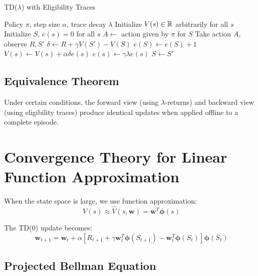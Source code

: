\begin{algorithm}
\caption{TD($\lambda$) with Eligibility Traces}
\begin{algorithmic}
\REQUIRE Policy $\pi$, step size $\alpha$, trace decay $\lambda$
\STATE Initialize $V(s) \in \mathbb{R}$ arbitrarily for all $s$
\REPEAT
    \STATE Initialize $S$, $e(s) = 0$ for all $s$
    \REPEAT
        \STATE $A \leftarrow$ action given by $\pi$ for $S$
        \STATE Take action $A$, observe $R, S'$
        \STATE $\delta \leftarrow R + \gamma V(S') - V(S)$
        \STATE $e(S) \leftarrow e(S) + 1$
            \STATE $V(s) \leftarrow V(s) + \alpha \delta e(s)$
            \STATE $e(s) \leftarrow \gamma \lambda e(s)$
        \ENDFOR
        \STATE $S \leftarrow S'$
\end{algorithmic}
\end{algorithm}

\subsection{Equivalence Theorem}

\begin{theorem}
Under certain conditions, the forward view (using $\lambda$-returns) and backward view (using eligibility traces) produce identical updates when applied offline to a complete episode.
\end{theorem}

\section{Convergence Theory for Linear Function Approximation}

When the state space is large, we use function approximation:
\begin{equation}
V(s) \approx \hat{V}(s, \mathbf{w}) = \mathbf{w}^T \boldsymbol{\phi}(s)
\end{equation}

The TD(0) update becomes:
\begin{equation}
\mathbf{w}_{t+1} = \mathbf{w}_t + \alpha[R_{t+1} + \gamma \mathbf{w}_t^T \boldsymbol{\phi}(S_{t+1}) - \mathbf{w}_t^T \boldsymbol{\phi}(S_t)]\boldsymbol{\phi}(S_t)
\end{equation}

\subsection{Projected Bellman Equation}

